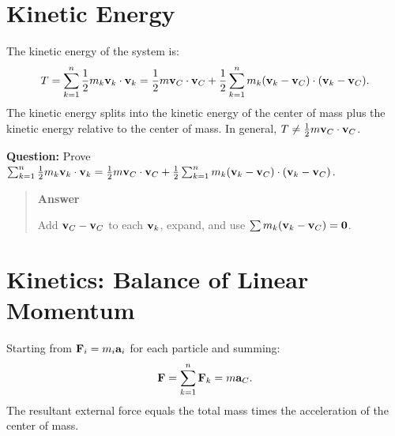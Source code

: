 \documentclass[
  letterpaper,
  DIV=11,
  numbers=noendperiod]{scrreprt}
\begin{document}
\section{Kinetic Energy}\label{kinetic-energy-1}

The kinetic energy of the system is: \begin{align}
    T = \sum_{k=1}^n\frac{1}{2}m_k{\bf v}_k\cdot{\bf v}_k = \frac{1}{2}m{\bf v}_C\cdot{\bf v}_C+\frac{1}{2}\sum_{k=1}^n m_k({\bf v}_k-{\bf v}_C)\cdot({\bf v}_k-{\bf v}_C).
\end{align} The kinetic energy splits into the kinetic energy of the
center of mass plus the kinetic energy relative to the center of mass.
In general, \(T \neq \frac{1}{2}m{\bf v}_C\cdot{\bf v}_C\).

\begin{tcolorbox}[enhanced jigsaw, arc=.35mm, bottomrule=.15mm, bottomtitle=1mm, breakable, colback=white, colbacktitle=quarto-callout-tip-color!10!white, colframe=quarto-callout-tip-color-frame, coltitle=black, left=2mm, leftrule=.75mm, opacityback=0, opacitybacktitle=0.6, rightrule=.15mm, title=\textcolor{quarto-callout-tip-color}{\faLightbulb}\hspace{0.5em}{Think!}, titlerule=0mm, toprule=.15mm, toptitle=1mm]

\textbf{Question:} Prove
\(\sum_{k=1}^n\frac{1}{2}m_k{\bf v}_k\cdot{\bf v}_k = \frac{1}{2}m{\bf v}_C\cdot{\bf v}_C+\frac{1}{2}\sum_{k=1}^n m_k({\bf v}_k-{\bf v}_C)\cdot({\bf v}_k-{\bf v}_C)\).

\begin{quote}
\textbf{Answer}

Add \({\bf v}_C-{\bf v}_C\) to each \({\bf v}_k\), expand, and use
\(\sum m_k({\bf v}_k-{\bf v}_C) = {\bf 0}\).
\end{quote}

\end{tcolorbox}

\section{Kinetics: Balance of Linear
Momentum}\label{kinetics-balance-of-linear-momentum}

Starting from \({\bf F}_i = m_i{\bf a}_i\) for each particle and
summing: \begin{align}
    {\bf F} = \sum_{k=1}^n{\bf F}_k = m{\bf a}_C.
\end{align} The resultant external force equals the total mass times the
acceleration of the center of mass.
\end{document}
